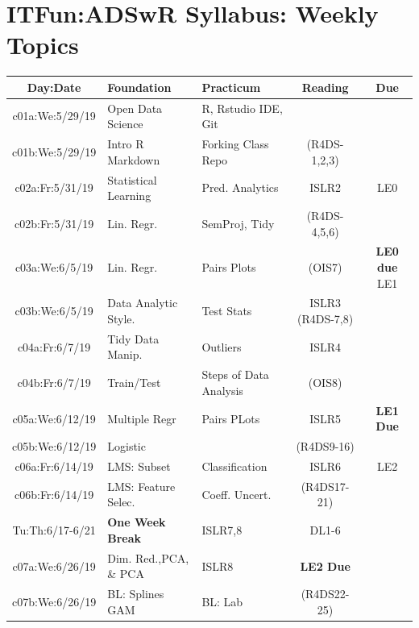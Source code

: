 \documentclass[11pt]{article} %
\begin{document}
\section{ITFun:ADSwR Syllabus: Weekly Topics}
\begin{table}[h] 
  \centering %
  \begin{tabular}{| c | p{4cm} | p{4cm} | c | c |} %
    \hline %
    Day:Date & Foundation & Practicum  & Reading & Due  \\ %
    \hline 
    \hline %
    c01a:We:5/29/19 & Open Data Science & R, Rstudio IDE, Git &  & \\ %
    \hline %
    c01b:We:5/29/19 & Intro R Markdown & Forking Class Repo & (R4DS-1,2,3) & \\ 
    \hline  
    \hline
    c02a:Fr:5/31/19 & Statistical Learning & Pred. Analytics & ISLR2 & LE0 \\ 
    \hline
    c02b:Fr:5/31/19 &  Lin. Regr. & SemProj, Tidy & (R4DS-4,5,6) &  \\
    \hline 
    \hline
    c03a:We:6/5/19 & Lin. Regr. & Pairs Plots & (OIS7) & {\bf LE0 due} LE1 \\ 
    \hline
    c03b:We:6/5/19 & Data Analytic Style. & Test Stats & ISLR3 (R4DS-7,8) & \\
    \hline
    \hline 
    c04a:Fr:6/7/19 & Tidy Data Manip. & Outliers & ISLR4 &   \\ 
    \hline
    c04b:Fr:6/7/19 & Train/Test & Steps of Data Analysis & (OIS8) & \\
    \hline
    \hline 
    c05a:We:6/12/19 & Multiple Regr & Pairs PLots & ISLR5 & {\bf LE1 Due} \\ 
    \hline
    c05b:We:6/12/19 & Logistic  &  & (R4DS9-16) &  \\
    \hline
    \hline 
    c06a:Fr:6/14/19 & LMS: Subset & Classification & ISLR6 & LE2 \\ 
    \hline
    c06b:Fr:6/14/19 & LMS: Feature Selec. & Coeff. Uncert. & (R4DS17-21) &  \\
    \hline
    \hline 
    Tu:Th:6/17-6/21 & {\bf One Week Break} & ISLR7,8 & DL1-6 &  \\ 
    \hline
    \hline 
    c07a:We:6/26/19 & Dim. Red.,PCA, \& PCA & ISLR8 & {\bf LE2 Due} \\ 
    \hline
    c07b:We:6/26/19 & BL: Splines GAM & BL: Lab & (R4DS22-25) &  \\

\end{tabular}
\end{table}
\end{document}
